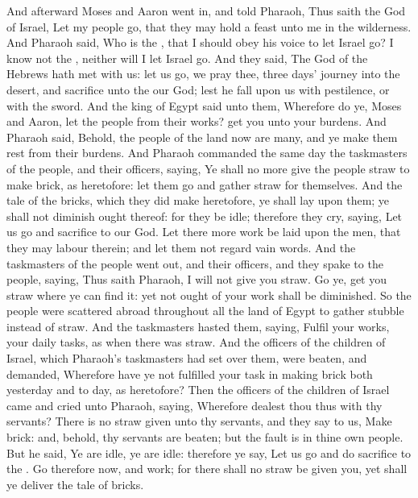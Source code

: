 \begin{biblechapter} %
 And afterward Moses and Aaron went in, and told Pharaoh, Thus saith the \LORD God of Israel, Let my people go, that they may hold a feast unto me in the wilderness.
\verse And Pharaoh said, Who is the \LORD, that I should obey his voice to let Israel go? I know not the \LORD, neither will I let Israel go.
\verse And they said, The God of the Hebrews hath met with us: let us go, we pray thee, three days' journey into the desert, and sacrifice unto the \LORD our God; lest he fall upon us with pestilence, or with the sword.
\verse And the king of Egypt said unto them, Wherefore do ye, Moses and Aaron, let the people from their works? get you unto your burdens.
\verse And Pharaoh said, Behold, the people of the land now are many, and ye make them rest from their burdens.
\verse And Pharaoh commanded the same day the taskmasters of the people, and their officers, saying,
\verse Ye shall no more give the people straw to make brick, as heretofore: let them go and gather straw for themselves.
\verse And the tale of the bricks, which they did make heretofore, ye shall lay upon them; ye shall not diminish ought thereof: for they be idle; therefore they cry, saying, Let us go and sacrifice to our God.
\verse Let there more work be laid upon the men, that they may labour therein; and let them not regard vain words.
\verse And the taskmasters of the people went out, and their officers, and they spake to the people, saying, Thus saith Pharaoh, I will not give you straw.
\verse Go ye, get you straw where ye can find it: yet not ought of your work shall be diminished.
\verse So the people were scattered abroad throughout all the land of Egypt to gather stubble instead of straw.
\verse And the taskmasters hasted them, saying, Fulfil your works, your daily tasks, as when there was straw.
\verse And the officers of the children of Israel, which Pharaoh's taskmasters had set over them, were beaten, and demanded, Wherefore have ye not fulfilled your task in making brick both yesterday and to day, as heretofore?
\verse Then the officers of the children of Israel came and cried unto Pharaoh, saying, Wherefore dealest thou thus with thy servants?
\verse There is no straw given unto thy servants, and they say to us, Make brick: and, behold, thy servants are beaten; but the fault is in thine own people.
\verse But he said, Ye are idle, ye are idle: therefore ye say, Let us go and do sacrifice to the \LORD.
\verse Go therefore now, and work; for there shall no straw be given you, yet shall ye deliver the tale of bricks.

\end{biblechapter}
